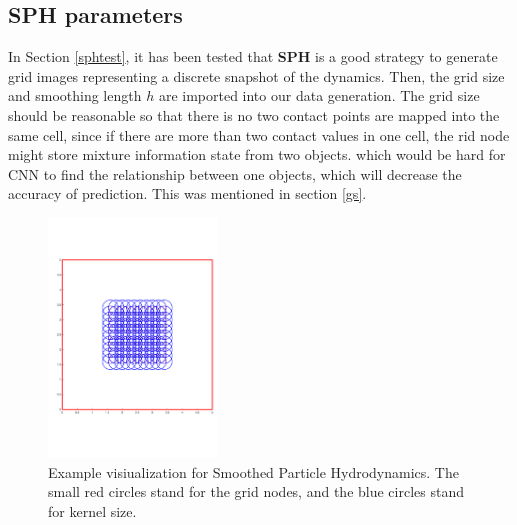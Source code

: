 \subsection{SPH parameters}
    \label{SPH-setting}
    In Section \ref{sphtest}, it has been tested that \textbf{SPH} is a good strategy to generate grid images representing a discrete snapshot of the dynamics. Then, the grid size and smoothing length $h$ are imported into our data generation. The grid size should be reasonable so that there is no two contact points are mapped into the same cell, since if there are more than two contact values in one cell, the rid node might store mixture information state from two objects. which would be hard for CNN to find the relationship between one objects, which will decrease the accuracy of prediction. This was mentioned in section \ref{gs}.
    \begin{figure}[!h]
        \centering
        \includegraphics[width=0.4\textwidth]{Figures/SPHvi.pdf}
        \caption{Example visiualization for Smoothed Particle Hydrodynamics. The small red circles stand for the grid nodes, and the blue circles stand for kernel size.}
    \end{figure}

